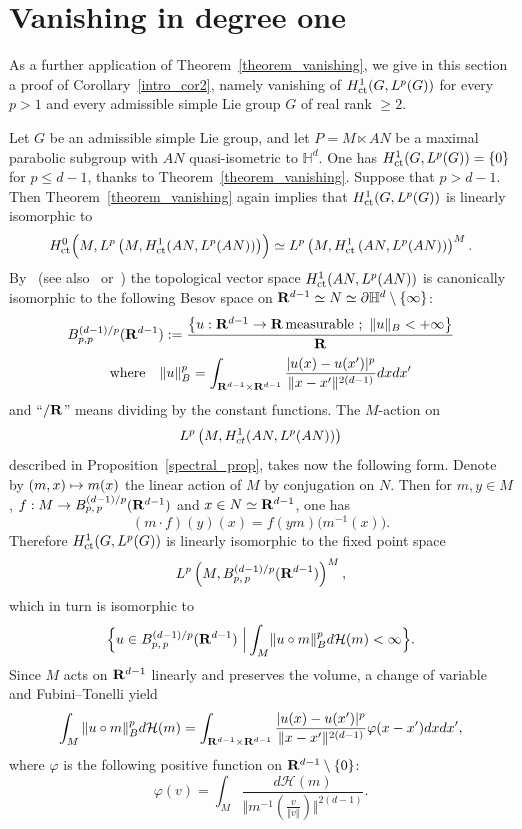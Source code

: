 \documentclass[11pt]{article}
\theoremstyle{definition}
\numberwithin{equation}{section}
\numberwithin{figure}{section}
\numberwithin{table}{section}
\DeclareMathOperator{\ct}{ct}
\begin{document}
\section{Vanishing in degree one}\label{9}
As a further application of Theorem~\ref{theorem_vanishing}, we give in this section a proof of Corollary~\ref{intro_cor2}, namely vanishing of ${\rm H}^1 _{\ct} (G, L^p(G))$ for every $p>1$ and every admissible simple Lie group $G$ of real rank $\geqslant 2$.


Let $G$ be an admissible simple Lie group, and let $P = M \ltimes AN$ be a maximal parabolic subgroup with $AN$ quasi-isometric to $\mathbb H ^d$. One has ${\rm H}_{\ct} ^1 (G, L^p (G)) = \{0\}$ for $p \leqslant d-1$, thanks to Theorem~\ref{theorem_vanishing}. Suppose that $p > d-1$. Then Theorem~\ref{theorem_vanishing} again implies that ${\rm H}_{\ct} ^1 (G, L^p (G))$ is linearly isomorphic to
\[
{\rm H}_{\ct}^0 \Bigl(M, L^p \left(M, {\rm H}_{\ct}^1 (AN, L^p (AN))\right)\Bigr) \simeq
L^p \left(M, {\rm H}_{\ct}^1 \left(AN, L^p (AN)\right)\right) ^M.
\]
By~\cite{Pa1} (see also~\cite{Rez} or~\cite{BP2}) the topological vector space ${\rm H}_{\ct} ^1 (AN, L^p (AN))$ is canonically isomorphic to the following Besov space on ${\bf R}^{d-1} \simeq N \simeq \partial \mathbb H ^d \setminus \{\infty \}$:
\[
B^{(d-1)/p} _{p,p} ({\bf R} ^{d-1}) :=
\frac{\left\{u : {\bf R} ^{d-1} \to {\bf R}\,\text{measurable}
~;~\Vert u \Vert _B < +\infty \right\}}{{\bf R}}
\]
\[
\text{where}\quad\Vert u \Vert _B ^p = \int _{{\bf R} ^{d-1} \times {\bf R} ^{d-1}}
\frac{\vert u(x) - u(x') \vert ^p}{\Vert x-x' \Vert ^{2(d-1)}} dxdx'
\]
and ``$/{\bf R}$'' means dividing by the constant functions. The $M$-action on
\[
L^p\left(M, {\rm H}^1 _{\rm ct} (AN, L^p(AN))\right)
\]
described in Proposition~\ref{spectral_prop}, takes now the following form. Denote by $(m, x)\linebreak \mapsto m(x)$ the linear action of $M$ by conjugation on $N$. Then for $m, y \in M$, $f : M \to B^{(d-1)/p} _{p,\,p} ({\bf R} ^{d-1})$ and $x \in N \simeq {\bf R}^{d-1}$, one has
\[
(m \cdot f) (y)(x) = f(ym)\bigl(m ^{-1} (x)\bigr).
\]
Therefore ${\rm H}_{\ct} ^1 (G, L^p (G))$ is linearly isomorphic to the fixed point space
\[
L^p \left(M, B_{p,\,p} ^{(d-1)/p} ({\bf R} ^{d-1}) \right)^M,
\]
which in turn is isomorphic to
\[
\Bigl\{u \in B_{p,\,p} ^{(d-1)/p} ({\bf R} ^{d-1})~\Big\vert \int _M \!\Vert u \circ m \Vert _B ^p d\mathcal H (m)
< \infty \Bigr\}.
\]
Since $M$ acts on ${\bf R} ^{d-1}$ linearly and preserves the volume, a change of variable and Fubini--Tonelli yield
\begin{equation}\label{H^1_eq0}
\int _M \Vert u \circ m \Vert _B ^p d\mathcal H (m) = \int _{{\bf R} ^{d-1} \times {\bf R}^{d-1}} \frac{\vert u(x) - u(x') \vert^p}{\Vert x-x' \Vert^{2(d-1)}}
\varphi (x-x') dxdx',
\end{equation}
where $\varphi$ is the following positive function on ${\bf R} ^{d-1} \setminus \{0 \}$:
\begin{equation}\label{H^1_eq}
\varphi (v) = \int _M \frac{d \mathcal H (m)}{\bigl\Vert m^{-1} \left(\frac{v}{\Vert v \Vert}\right) \bigr\Vert ^{2(d-1)}}.
\end{equation}
\end{document}
